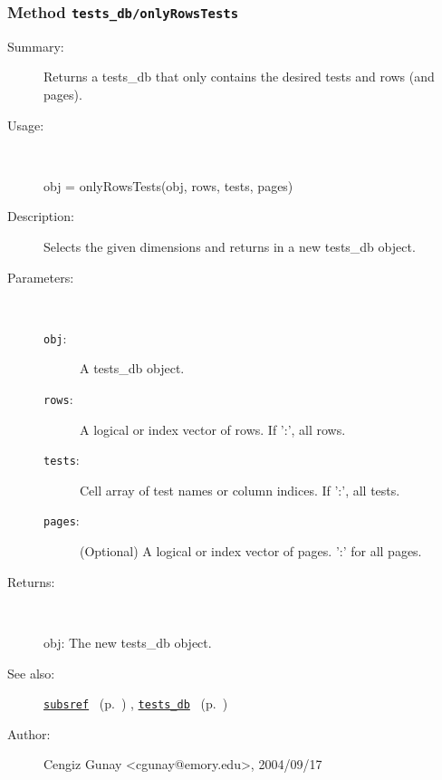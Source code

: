 \subsubsection[Method \texttt{onlyRowsTests}]{Method \texttt{tests\_db/onlyRowsTests}}%
%
\label{ref_tests_db__onlyRowsTests}%
\hypertarget{ref_tests_db__onlyRowsTests}{}%
\begin{description}
\item[Summary:]Returns a tests\_db that only contains the desired 
		tests and rows (and pages).
%
\item[Usage:]~%
\begin{lyxcode}%
obj = onlyRowsTests(obj, rows, tests, pages)
%
\end{lyxcode}%
%
\item[Description:]%
Selects the given dimensions and returns in a new tests\_db object.
\item[Parameters:]~
\begin{description}%
\item[\texttt{obj}:]
 A tests\_db object.
\item[\texttt{rows}:]
 A logical or index vector of rows. If ':', all rows.
\item[\texttt{tests}:]
 Cell array of test names or column indices. If ':', all tests.
\item[\texttt{pages}:]
 (Optional) A logical or index vector of pages. ':' for all pages.
\end{description}%
%
\item[Returns:]~

	obj: The new tests\_db object.
%
%
\item[See also:]%
\hyperlink{ref_subsref}{\texttt{subsref}}%
\ (p.~\pageref{ref_subsref})%
%
, \hyperlink{ref_tests_db}{\texttt{tests\_db}}%
\ (p.~\pageref{ref_tests_db})%
%
%
\item[Author:]%
Cengiz Gunay <cgunay@emory.edu>, 2004/09/17%
\end{description}
\methodline%
